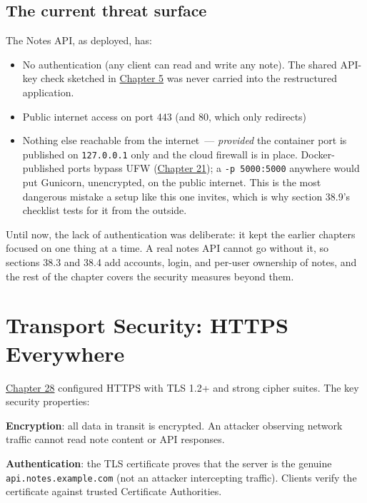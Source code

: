 \subsection*{The current threat surface}\label{38-security:the-current-threat-surface}

The Notes API, as deployed, has:

\begin{itemize}
\tightlist
\item
  No authentication (any client can read and write any note). The shared API-key check sketched in \hyperref[ch:05-internal-request-execution]{Chapter 5} was never carried into the restructured application.
\item
  Public internet access on port 443 (and 80, which only redirects)
\item
  Nothing else reachable from the internet~--- \emph{provided} the container port is published on \texttt{127.0.0.1} only and the cloud firewall is in place. Docker-published ports bypass UFW (\hyperref[ch:21-system-setup]{Chapter 21}); a \texttt{-p\ 5000:5000} anywhere would put Gunicorn, unencrypted, on the public internet. This is the most dangerous mistake a setup like this one invites, which is why section 38.9's checklist tests for it from the outside.
\end{itemize}

\noindent{}Until now, the lack of authentication was deliberate: it kept the earlier chapters focused on one thing at a time. A real notes API cannot go without it, so sections 38.3 and 38.4 add accounts, login, and per-user ownership of notes, and the rest of the chapter covers the security measures beyond them.

\setcounter{section}{1}
\section{Transport Security: HTTPS Everywhere}\label{38-security:382-transport-security-https-everywhere}

\hyperref[ch:28-traffic-routing]{Chapter 28} configured HTTPS with TLS 1.2+ and strong cipher suites. The key security properties:

\textbf{Encryption}: all data in transit is encrypted. An attacker observing network traffic cannot read note content or API responses.

\textbf{Authentication}: the TLS certificate proves that the server is the genuine \texttt{api.notes.example.com} (not an attacker intercepting traffic). Clients verify the certificate against trusted Certificate Authorities.

